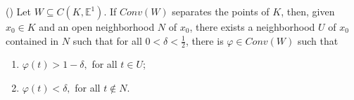 \documentclass[12pt]{amsart}
\begin{document}
%
%

\begin{lemma}\label{pat3} (\cite[Lemma 3.6]{FSS17}) Let $ W \subseteq C(K, \mathbb{E}^1)$. If $Conv(W)$ separates the points of $K$, then, given $x_0 \in K$ and an open neighborhood $N$ of $x_0$, there exists a neighborhood $U$ of $x_0$ contained in $N$ such that for all $0 < \delta < \frac{1}{2}$, there is $\varphi \in Conv(W)$ such that

\begin{enumerate}
\item $\varphi (t) > 1 - \delta,$ for all $t \in U$;
\item $\varphi (t) < \delta,$ for all $t \notin N$.
\end{enumerate}

\end{lemma}
\end{document}
